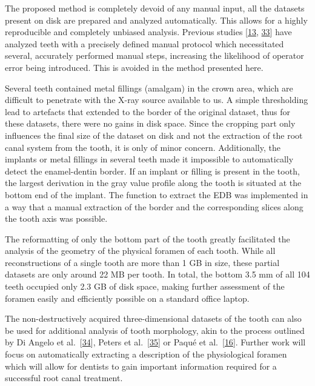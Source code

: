 \documentclass[
  american,
]{article}
\begin{document}
The proposed method is completely devoid of any manual input, all the datasets present on disk are prepared and analyzed automatically.
This allows for a highly reproducible and completely unbiased analysis.
Previous studies {[}\protect\hyperlink{ref-19SVNdOdA}{13}, \protect\hyperlink{ref-jsWNcnau}{33}{]} have analyzed teeth with a precisely defined manual protocol which necessitated several, accurately performed manual steps, increasing the likelihood of operator error being introduced.
This is avoided in the method presented here.

Several teeth contained metal fillings (amalgam) in the crown area, which are difficult to penetrate with the X-ray source available to us.
A simple thresholding lead to artefacts that extended to the border of the original dataset, thus for these datasets, there were no gains in disk space.
Since the cropping part only influences the final size of the dataset on disk and not the extraction of the root canal system from the tooth, it is only of minor concern.
Additionally, the implants or metal fillings in several teeth made it impossible to automatically detect the enamel-dentin border.
If an implant or filling is present in the tooth, the largest derivation in the gray value profile along the tooth is situated at the bottom end of the implant.
The function to extract the EDB was implemented in a way that a manual extraction of the border and the corresponding slices along the tooth axis was possible.

The reformatting of only the bottom part of the tooth greatly facilitated the analysis of the geometry of the physical foramen of each tooth.
While all reconstructions of a single tooth are more than 1 GB in size, these partial datasets are only around 22 MB per tooth.
In total, the bottom 3.5 mm of all 104 teeth occupied only 2.3 GB of disk space, making further assessment of the foramen easily and efficiently possible on a standard office laptop.

The non-destructively acquired three-dimensional datasets of the tooth can also be used for additional analysis of tooth morphology, akin to the process outlined by Di Angelo et al.~{[}\protect\hyperlink{ref-1Egw08k0d}{34}{]}, Peters et al.~{[}\protect\hyperlink{ref-RxErLYuw}{35}{]} or Paqué et al.~{[}\protect\hyperlink{ref-DLVCfdzK}{16}{]}.
Further work will focus on automatically extracting a description of the physiological foramen which will allow for dentists to gain important information required for a successful root canal treatment.
\end{document}
